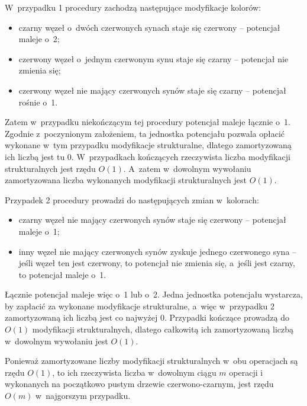\subproblem %
W~przypadku 1 procedury  zachodzą następujące modyfikacje kolorów:
\begin{itemize}
	\item czarny węzeł o~dwóch czerwonych synach staje się czerwony -- potencjał maleje o~2;
	\item czerwony węzeł o~jednym czerwonym synu staje się czarny -- potencjał nie zmienia się;
	\item czerwony węzeł nie mający czerwonych synów staje się czarny -- potencjał rośnie o~1.
\end{itemize}
Zatem w~przypadku niekończącym tej procedury potencjał maleje łącznie o~1.
Zgodnie z~poczynionym założeniem, ta jednostka potencjału pozwala opłacić wykonane w~tym przypadku modyfikacje strukturalne, dlatego zamortyzowaną ich liczbą jest tu 0.
W~przypadkach kończących rzeczywista liczba modyfikacji strukturalnych jest rzędu $O(1)$.
A~zatem w~dowolnym wywołaniu  zamortyzowana liczba wykonanych modyfikacji strukturalnych jest $O(1)$.

\subproblem %
Przypadek 2 procedury  prowadzi do następujących zmian w~kolorach:
\begin{itemize}
	\item czarny węzeł nie mający czerwonych synów staje się czerwony -- potencjał maleje o~1;
	\item inny węzeł nie mający czerwonych synów zyskuje jednego czerwonego syna -- jeśli węzeł ten jest czerwony, to potencjał nie zmienia się, a~jeśli jest czarny, to potencjał maleje o~1.
\end{itemize}
Łącznie potencjał maleje więc o~1 lub o~2.
Jedna jednostka potencjału wystarcza, by zapłacić za wykonane modyfikacje strukturalne, a~więc w~przypadku 2 zamortyzowaną ich liczbą jest co najwyżej 0.
Przypadki kończące prowadzą do $O(1)$ modyfikacji strukturalnych, dlatego całkowitą ich zamortyzowaną liczbą w~dowolnym wywołaniu  jest $O(1)$.

\subproblem %
Ponieważ zamortyzowane liczby modyfikacji strukturalnych w~obu operacjach są rzędu $O(1)$, to ich rzeczywista liczba w~dowolnym ciągu $m$ operacji  i~ wykonanych na początkowo pustym drzewie czerwono-czarnym, jest rzędu $O(m)$ w~najgorszym przypadku.
